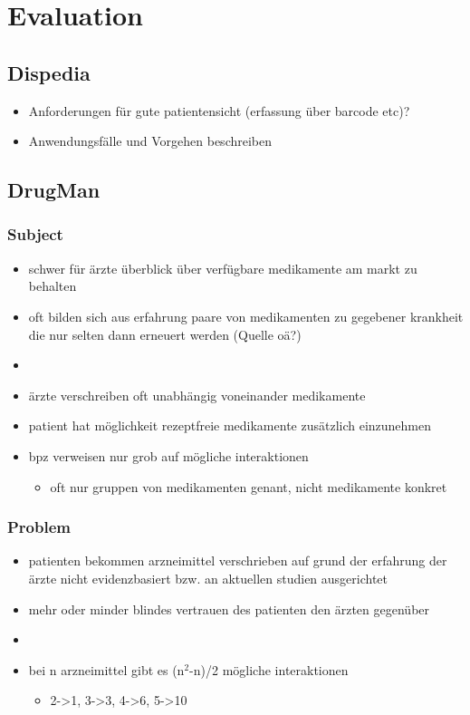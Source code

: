 
\chapter{Evaluation}
\label{cha:evaluation}

\section{Dispedia}
\label{sec:dispedia}
\begin{itemize}
\item Anforderungen für gute patientensicht (erfassung über barcode etc)?
\item Anwendungsfälle und Vorgehen beschreiben
\end{itemize}
\section{DrugMan}
\label{sec:portal}

\subsection{Subject}
\label{sec-1}

\begin{itemize}
\item schwer für ärzte überblick über verfügbare medikamente am markt zu behalten
\item oft bilden sich aus erfahrung paare von medikamenten zu gegebener krankheit die nur selten dann erneuert werden (Quelle oä?)
\item 
\item ärzte verschreiben oft unabhängig voneinander medikamente
\item patient hat möglichkeit rezeptfreie medikamente zusätzlich einzunehmen
\item bpz verweisen nur grob auf mögliche interaktionen
\begin{itemize}
\item oft nur gruppen von medikamenten genant, nicht medikamente konkret
\end{itemize}
\end{itemize}
\subsection{Problem}
\label{sec-2}

\begin{itemize}
\item patienten bekommen arzneimittel verschrieben auf grund der erfahrung der ärzte nicht evidenzbasiert bzw. an aktuellen studien ausgerichtet
\item mehr oder minder blindes vertrauen des patienten den ärzten gegenüber
\item 
\item bei n arzneimittel gibt es (n$^2$-n)/2 mögliche interaktionen
\begin{itemize}
\item 2->1, 3->3, 4->6, 5->10
\end{itemize}
\end{itemize}
